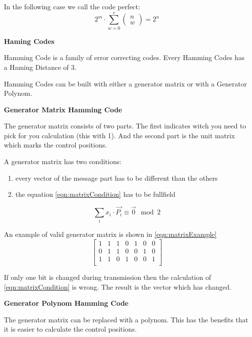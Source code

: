 \documentclass[11pt,twoside,twocolumn,landscape]{article}
\begin{document}
In the following case we call the code perfect:
\begin{equation}
  2^m \cdot \sum_{w=0}^e \begin{pmatrix} n \\ w \end{pmatrix} = 2^n
\end{equation}

\textbf{Haming Codes}

Hamming Code is a family of error correcting codes.
Every Hamming Codes has a Haming Distance of 3.


Hamming Codes can be built with either a generator matrix or with a Generator Polynom.

\textbf{Generator Matrix Hamming Code}

The generator matrix consists of two parts.
The first indicates witch you need to pick for you calculation (this with 1).
And the second part is the unit matrix which marks the control positions.

A generator matrix has two conditions:
\begin{enumerate}
\item every vector of the message part has to be different than the others
\item the equation \ref{eqn:matrixCondition} has to be fullfield
\end{enumerate}

\begin{equation}\label{eqn:matrixCondition}
  \sum_i x_i \cdot \vec{P_i} \equiv \vec{0} \mod 2
\end{equation}


An example of valid generator matrix is shown in \ref{eqn:matrixExample}
\begin{equation}\label{eqn:matrixExample}
  \left[
    \begin{array}{cccc|ccc}
      1 & 1 & 1 & 0 & 1 & 0 & 0 \\
      0 & 1 & 1 & 0 & 0 & 1 & 0 \\
      1 & 1 & 0 & 1 & 0 & 0 & 1 \\
    \end{array}
    \right]
\end{equation}

If only one bit is changed during transmission then the calculation of \ref{eqn:matrixCondition} is wrong.
The result is the vector which has changed.

\textbf{Generator Polynom Hamming Code}

The generator matrix can be replaced with a polynom.
This has the benefits that it is easier to calculate the control positions.
\end{document}
